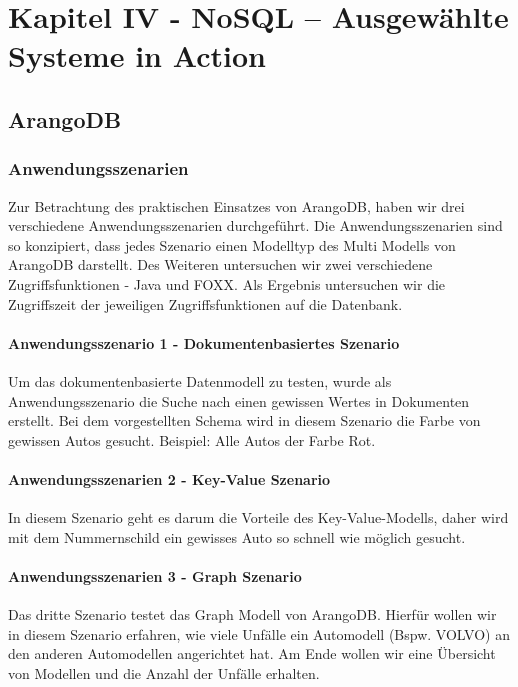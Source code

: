 \chapter{Kapitel IV - NoSQL – Ausgewählte Systeme in Action}
\section{ArangoDB}
\subsection{Anwendungsszenarien}
Zur Betrachtung des praktischen Einsatzes von ArangoDB, haben wir drei verschiedene Anwendungsszenarien durchgeführt. Die Anwendungsszenarien sind so konzipiert, dass jedes Szenario einen Modelltyp des Multi Modells von ArangoDB darstellt. Des Weiteren untersuchen wir zwei verschiedene Zugriffsfunktionen - Java und FOXX. Als Ergebnis untersuchen wir die Zugriffszeit der jeweiligen Zugriffsfunktionen auf die Datenbank.
\subsubsection{Anwendungsszenario 1 - Dokumentenbasiertes Szenario}
Um das dokumentenbasierte Datenmodell zu testen, wurde als Anwendungsszenario die Suche nach einen gewissen Wertes in Dokumenten erstellt. Bei dem vorgestellten Schema wird in diesem Szenario die Farbe von gewissen Autos gesucht. Beispiel: Alle Autos der Farbe Rot.
\subsubsection{Anwendungsszenarien 2 - Key-Value Szenario}
In diesem Szenario geht es darum die Vorteile des Key-Value-Modells, daher wird mit dem Nummernschild ein gewisses Auto so schnell wie möglich gesucht.
\subsubsection{Anwendungsszenarien 3 - Graph Szenario}
Das dritte Szenario testet das Graph Modell von ArangoDB. Hierfür wollen wir in diesem Szenario erfahren, wie viele Unfälle ein Automodell (Bspw. VOLVO) an den anderen Automodellen angerichtet hat. Am Ende wollen wir eine Übersicht von Modellen und die Anzahl der Unfälle erhalten.


